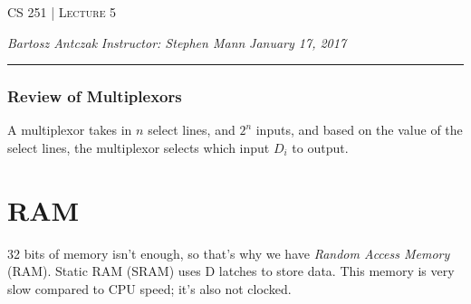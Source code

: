 \documentclass{report}
\newcommand{\lectureNum}{5}
\newcommand{\curDate}{January 17, 2017}
\newcommand{\course}{CS 251}
\newcommand{\instructor}{Stephen Mann}
\begin{document}
\begin{center}
\begin{Large}
\textsc{\course{} | Lecture \lectureNum{}}
\end{Large}
\end{center} 
\noindent \textit{Bartosz Antczak} \hfill
\textit{Instructor: \instructor{}} \hfill
\textit{\curDate{}}
\rule{\textwidth}{0.4pt}
\subsubsection{Review of Multiplexors}
A multiplexor takes in $n$ select lines, and $2^n$ inputs, and based on the value of the select lines, the multiplexor selects which input $D_i$ to output.
\section{RAM}
32 bits of memory isn't enough, so that's why we have \textit{Random Access Memory} (RAM). Static RAM (SRAM) uses D latches to store data. This memory is very slow compared to CPU speed; it's also not clocked.
\end{document}
